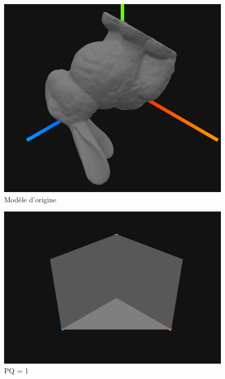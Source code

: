 \documentclass{article}
\begin{document}
\begin{figure}[h!]
\centerline{\includegraphics[scale=0.8]{./rendus/original.png}}
\caption{Modèle d'origine}
\end{figure}

\begin{figure}[h!]
\centerline{\includegraphics[scale=0.8]{./rendus/pq1.png}}
\caption{PQ = 1}
\end{figure}
\end{document}
